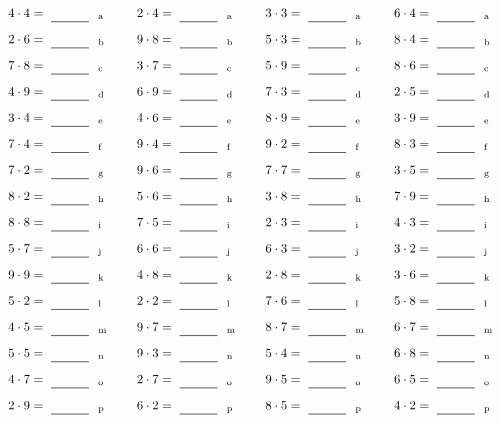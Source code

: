 \documentclass
[
  draft    = true,
  fontsize = 11pt,
  parskip  = half-
]
{scrartcl}
\begin{document}
\par\vfill\par
\begin{align*}
    \pline{4\cdot4}&=\rline{a}
  & \pline{2\cdot4}&=\rline{a}
  & \pline{3\cdot3}&=\rline{a}
  & \pline{6\cdot4}&=\rline{a} \\[1ex]
    \pline{2\cdot6}&=\rline{b}
  & \pline{9\cdot8}&=\rline{b}
  & \pline{5\cdot3}&=\rline{b}
  & \pline{8\cdot4}&=\rline{b} \\[1ex]
    \pline{7\cdot8}&=\rline{c}
  & \pline{3\cdot7}&=\rline{c}
  & \pline{5\cdot9}&=\rline{c}
  & \pline{8\cdot6}&=\rline{c} \\[1ex]
    \pline{4\cdot9}&=\rline{d}
  & \pline{6\cdot9}&=\rline{d}
  & \pline{7\cdot3}&=\rline{d}
  & \pline{2\cdot5}&=\rline{d} \\[1ex]
    \pline{3\cdot4}&=\rline{e}
  & \pline{4\cdot6}&=\rline{e}
  & \pline{8\cdot9}&=\rline{e}
  & \pline{3\cdot9}&=\rline{e} \\[1ex]
    \pline{7\cdot4}&=\rline{f}
  & \pline{9\cdot4}&=\rline{f}
  & \pline{9\cdot2}&=\rline{f}
  & \pline{8\cdot3}&=\rline{f} \\[1ex]
    \pline{7\cdot2}&=\rline{g}
  & \pline{9\cdot6}&=\rline{g}
  & \pline{7\cdot7}&=\rline{g}
  & \pline{3\cdot5}&=\rline{g} \\[1ex]
    \pline{8\cdot2}&=\rline{h}
  & \pline{5\cdot6}&=\rline{h}
  & \pline{3\cdot8}&=\rline{h}
  & \pline{7\cdot9}&=\rline{h} \\[1ex]
    \pline{8\cdot8}&=\rline{i}
  & \pline{7\cdot5}&=\rline{i}
  & \pline{2\cdot3}&=\rline{i}
  & \pline{4\cdot3}&=\rline{i} \\[1ex]
    \pline{5\cdot7}&=\rline{j}
  & \pline{6\cdot6}&=\rline{j}
  & \pline{6\cdot3}&=\rline{j}
  & \pline{3\cdot2}&=\rline{j} \\[1ex]
    \pline{9\cdot9}&=\rline{k}
  & \pline{4\cdot8}&=\rline{k}
  & \pline{2\cdot8}&=\rline{k}
  & \pline{3\cdot6}&=\rline{k} \\[1ex]
    \pline{5\cdot2}&=\rline{l}
  & \pline{2\cdot2}&=\rline{l}
  & \pline{7\cdot6}&=\rline{l}
  & \pline{5\cdot8}&=\rline{l} \\[1ex]
    \pline{4\cdot5}&=\rline{m}
  & \pline{9\cdot7}&=\rline{m}
  & \pline{8\cdot7}&=\rline{m}
  & \pline{6\cdot7}&=\rline{m} \\[1ex]
    \pline{5\cdot5}&=\rline{n}
  & \pline{9\cdot3}&=\rline{n}
  & \pline{5\cdot4}&=\rline{n}
  & \pline{6\cdot8}&=\rline{n} \\[1ex]
    \pline{4\cdot7}&=\rline{o}
  & \pline{2\cdot7}&=\rline{o}
  & \pline{9\cdot5}&=\rline{o}
  & \pline{6\cdot5}&=\rline{o} \\[1ex]
    \pline{2\cdot9}&=\rline{p}
  & \pline{6\cdot2}&=\rline{p}
  & \pline{8\cdot5}&=\rline{p}
  & \pline{4\cdot2}&=\rline{p}
\end{align*}
\end{document}
